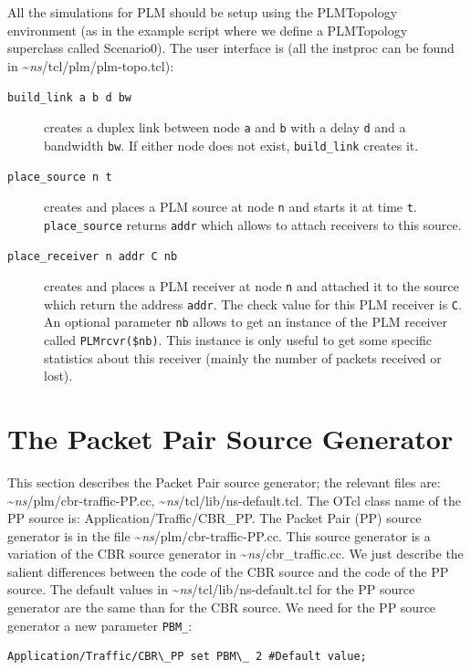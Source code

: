 {All the simulations for PLM should be setup using the PLMTopology environment (as
in the example script where we define a PLMTopology superclass called Scenario0). The
user interface is (all the instproc can be found in \textasciitilde\emph{ns}/{tcl/plm/plm-topo.tcl}):
\begin{description}
\item[\tt build\_link a b d bw] creates a duplex link between node
  {\tt a} and {\tt b} with a delay {\tt d} and a bandwidth {\tt bw}. If
  either node does not exist, {\tt build\_link} creates it.
\item[\tt place\_source n t] creates and places a PLM source at node {\tt n} and
  starts it at time {\tt t}. {\tt place\_source} returns {\tt addr} which
  allows to attach receivers to this source.
\item[\tt place\_receiver n addr C nb] creates and places a PLM receiver at node
  {\tt n} and attached it to the source which return the address {\tt addr}. The
  check value for this PLM receiver is {\tt C}. An optional parameter {\tt nb}
  allows to get an instance of the PLM receiver called {\tt PLMrcvr(\$nb)}. This
  instance is only useful to get some specific statistics about this receiver
  (mainly the number of packets received or lost). %
\end{description}




\section{The Packet Pair Source Generator}
This section describes the Packet Pair source generator; the relevant files are:
\textasciitilde\emph{ns}/{plm/cbr-traffic-PP.cc}, \textasciitilde\emph{ns}/{tcl/lib/ns-default.tcl}. The OTcl class name of
the PP source is: Application/Traffic/CBR\_PP. 
The Packet Pair (PP) source generator is in the file
\textasciitilde\emph{ns}/{plm/cbr-traffic-PP.cc}. This source 
generator is a variation of the CBR source generator in \textasciitilde\emph{ns}/{cbr\_traffic.cc}.
We just describe the salient differences between the code of
the CBR source and the code of the PP source. 
The default values in \textasciitilde\emph{ns}/{tcl/lib/ns-default.tcl} for the PP source generator are the same
than for the CBR source. We need for the PP source generator a new parameter {\tt PBM\_}:
\begin{verbatim}
Application/Traffic/CBR\_PP set PBM\_ 2 #Default value;
\end{verbatim}

}
